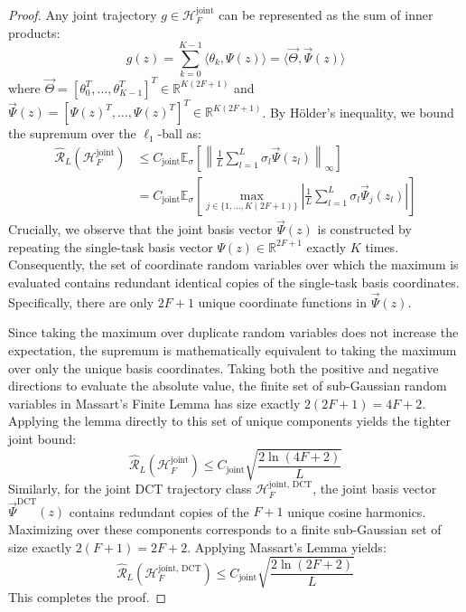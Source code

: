 \begin{proof}
Any joint trajectory $g \in \mathcal{H}_F^{\text{joint}}$ can be represented as the sum of inner products:
\begin{equation}
    g(z) = \sum_{k=0}^{K-1} \langle \theta_k, \Psi(z) \rangle = \langle \vec{\Theta}, \vec{\Psi}(z) \rangle
\end{equation}
where $\vec{\Theta} = [\theta_0^T, \dots, \theta_{K-1}^T]^T \in \mathbb{R}^{K(2F+1)}$ and $\vec{\Psi}(z) = [\Psi(z)^T, \dots, \Psi(z)^T]^T \in \mathbb{R}^{K(2F+1)}$. By H{\"o}lder's inequality, we bound the supremum over the $\ell_1$-ball as:
\begin{align}
    \widehat{\mathcal{R}}_L(\mathcal{H}_F^{\text{joint}}) &\le C_{\text{joint}} \mathbb{E}_{\sigma} \left[ \left\| \frac{1}{L} \sum_{l=1}^L \sigma_l \vec{\Psi}(z_l) \right\|_\infty \right] \\
    &= C_{\text{joint}} \mathbb{E}_{\sigma} \left[ \max_{j \in \{1, \dots, K(2F+1)\}} \left| \frac{1}{L} \sum_{l=1}^L \sigma_l \vec{\Psi}_j(z_l) \right| \right]
\end{align}
Crucially, we observe that the joint basis vector $\vec{\Psi}(z)$ is constructed by repeating the single-task basis vector $\Psi(z) \in \mathbb{R}^{2F+1}$ exactly $K$ times. Consequently, the set of coordinate random variables over which the maximum is evaluated contains redundant identical copies of the single-task basis coordinates. Specifically, there are only $2F+1$ unique coordinate functions in $\vec{\Psi}(z)$. 

Since taking the maximum over duplicate random variables does not increase the expectation, the supremum is mathematically equivalent to taking the maximum over only the unique basis coordinates. Taking both the positive and negative directions to evaluate the absolute value, the finite set of sub-Gaussian random variables in Massart's Finite Lemma has size exactly $2(2F+1) = 4F+2$. Applying the lemma directly to this set of unique components yields the tighter joint bound:
\begin{equation}
    \widehat{\mathcal{R}}_L(\mathcal{H}_F^{\text{joint}}) \le C_{\text{joint}} \sqrt{\frac{2 \ln(4F+2)}{L}}
\end{equation}
Similarly, for the joint DCT trajectory class $\mathcal{H}_F^{\text{joint, DCT}}$, the joint basis vector $\vec{\Psi}^{\text{DCT}}(z)$ contains redundant copies of the $F+1$ unique cosine harmonics. Maximizing over these components corresponds to a finite sub-Gaussian set of size exactly $2(F+1) = 2F+2$. Applying Massart's Lemma yields:
\begin{equation}
    \widehat{\mathcal{R}}_L(\mathcal{H}_F^{\text{joint, DCT}}) \le C_{\text{joint}} \sqrt{\frac{2 \ln(2F+2)}{L}}
\end{equation}
This completes the proof.
\end{proof}


